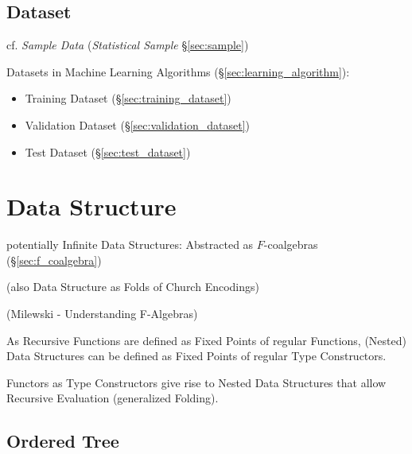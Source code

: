 \subsection{Dataset}\label{sec:dataset}

cf. \emph{Sample Data} (\emph{Statistical Sample} \S\ref{sec:sample})

Datasets in Machine Learning Algorithms (\S\ref{sec:learning_algorithm}):
\begin{itemize}
  \item Training Dataset (\S\ref{sec:training_dataset})
  \item Validation Dataset (\S\ref{sec:validation_dataset})
  \item Test Dataset (\S\ref{sec:test_dataset})
\end{itemize}



\section{Data Structure}\label{sec:data_structure}


potentially Infinite Data Structures: Abstracted as $F$-coalgebras
(\S\ref{sec:f_coalgebra})

(also Data Structure as Folds of Church Encodings)

(Milewski - Understanding F-Algebras)

As Recursive Functions are defined as Fixed Points of regular
Functions, (Nested) Data Structures can be defined as Fixed Points of
regular Type Constructors.

Functors as Type Constructors give rise to Nested Data Structures that
allow Recursive Evaluation (generalized Folding).



\subsection{Ordered Tree}\label{sec:ordered_tree}

